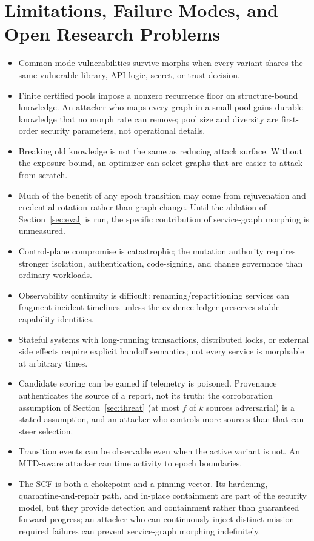 \documentclass[11pt,letterpaper]{article}
\begin{document}
\section{Limitations, Failure Modes, and Open Research Problems}

\begin{itemize}[leftmargin=1.5em,itemsep=2pt]
\item Common-mode vulnerabilities survive morphs when every variant shares the same vulnerable library, API logic, secret, or trust decision.
\item Finite certified pools impose a nonzero recurrence floor on structure-bound knowledge. An attacker who maps every graph in a small pool gains durable knowledge that no morph rate can remove; pool size and diversity are first-order security parameters, not operational details.
\item Breaking old knowledge is not the same as reducing attack surface. Without the exposure bound, an optimizer can select graphs that are easier to attack from scratch.
\item Much of the benefit of any epoch transition may come from rejuvenation and credential rotation rather than graph change. Until the ablation of Section~\ref{sec:eval} is run, the specific contribution of service-graph morphing is unmeasured.
\item Control-plane compromise is catastrophic; the mutation authority requires stronger isolation, authentication, code-signing, and change governance than ordinary workloads.
\item Observability continuity is difficult: renaming/repartitioning services can fragment incident timelines unless the evidence ledger preserves stable capability identities.
\item Stateful systems with long-running transactions, distributed locks, or external side effects require explicit handoff semantics; not every service is morphable at arbitrary times.
\item Candidate scoring can be gamed if telemetry is poisoned. Provenance authenticates the source of a report, not its truth; the corroboration assumption of Section~\ref{sec:threat} (at most $f$ of $k$ sources adversarial) is a stated assumption, and an attacker who controls more sources than that can steer selection.
\item Transition events can be observable even when the active variant is not. An MTD-aware attacker can time activity to epoch boundaries.
\item The SCF is both a chokepoint and a pinning vector. Its hardening, quarantine-and-repair path, and in-place containment are part of the security model, but they provide detection and containment rather than guaranteed forward progress; an attacker who can continuously inject distinct mission-required failures can prevent service-graph morphing indefinitely.

\end{itemize}
\end{document}

